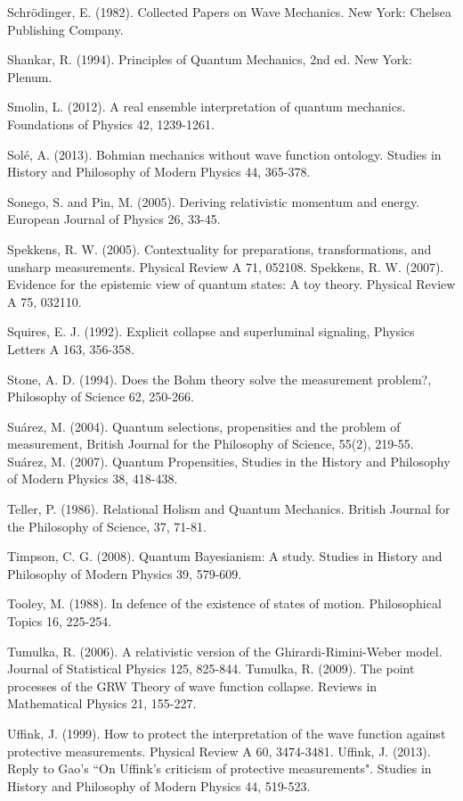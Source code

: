 \begin{thebibliography}{}
\bibitem{} Schr\"{o}dinger, E. (1982). Collected Papers on Wave Mechanics. New York: Chelsea Publishing Company.

\bibitem{} Shankar, R. (1994). Principles of Quantum Mechanics, 2nd ed. New York: Plenum.

\bibitem{} Smolin, L. (2012). A real ensemble interpretation of quantum mechanics. Foundations of Physics 42, 1239-1261.

\bibitem{} Sol\'{e}, A. (2013). Bohmian mechanics without wave function ontology. Studies in History and Philosophy of Modern Physics 44, 365-378.

\bibitem{} Sonego, S. and  Pin, M. (2005). Deriving relativistic momentum and energy. European Journal of Physics 26, 33-45.

\bibitem{} Spekkens, R. W. (2005). Contextuality for preparations, transformations, and unsharp measurements. Physical Review A 71, 052108. 
\bibitem{} Spekkens, R. W. (2007). Evidence for the epistemic view of quantum states: A toy theory. Physical Review A 75, 032110.


\bibitem{} Squires, E. J. (1992). Explicit collapse and superluminal signaling, Physics Letters A 163, 356-358.

\bibitem{}  Stone, A. D. (1994). Does the Bohm theory solve the measurement problem?, Philosophy of Science  62, 250-266.

\bibitem{} Su\'{a}rez, M. (2004). Quantum selections, propensities and the problem of measurement, British Journal for the Philosophy of Science, 55(2), 219-55.
\bibitem{} Su\'{a}rez, M. (2007). Quantum Propensities, Studies in the History and Philosophy of Modern Physics 38, 418-438.

\bibitem{} Teller, P. (1986). Relational Holism and Quantum Mechanics. British Journal for the Philosophy of Science, 37, 71-81.

\bibitem{} Timpson, C. G. (2008). Quantum Bayesianism: A study. Studies in History and Philosophy of Modern Physics 39, 579-609.

\bibitem{} Tooley, M. (1988). In defence of the existence of states of motion. Philosophical Topics 16, 225-254.

\bibitem{}  Tumulka, R. (2006). A relativistic version of the Ghirardi-Rimini-Weber model. Journal
of Statistical Physics 125, 825-844.
\bibitem{}  Tumulka, R. (2009). The point processes of the GRW Theory of wave function collapse. Reviews in Mathematical Physics 21, 155-227.

\bibitem{} Uffink, J. (1999). How to protect the interpretation of the wave function against protective measurements. Physical Review A 60, 3474-3481.
\bibitem{} Uffink, J. (2013). Reply to Gao's ``On Uffink's criticism of protective measurements". Studies in History and Philosophy of Modern Physics 44, 519-523.


\end{thebibliography}
